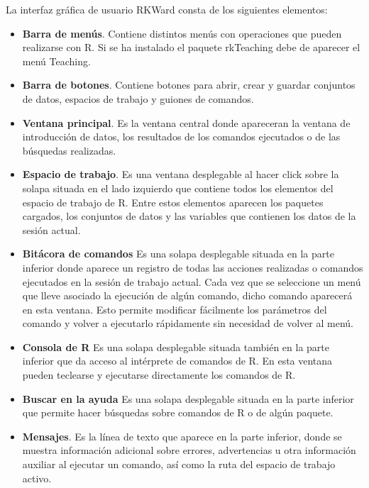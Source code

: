 La interfaz gráfica de usuario RKWard consta de los siguientes elementos:
\begin{itemize}
\item \textbf{Barra de menús}. Contiene distintos menús con operaciones que pueden realizarse con R. 
Si se ha instalado el paquete rkTeaching debe de aparecer el menú Teaching. 
\item \textbf{Barra de botones}. Contiene botones para abrir, crear y guardar conjuntos de datos, espacios de trabajo y guiones de comandos. 
\item \textbf{Ventana principal}. Es la ventana central donde apareceran la ventana de introducción de datos, los resultados de los comandos ejecutados o de las búsquedas realizadas. 
\item \textbf{Espacio de trabajo}. Es una ventana desplegable al hacer click sobre la solapa situada en el lado izquierdo que contiene todos los elementos del espacio de trabajo de R.
Entre estos elementos aparecen los paquetes cargados, los conjuntos de datos y las variables que contienen los datos de la sesión actual. 
\item \textbf{Bitácora de comandos} Es una solapa desplegable situada en la parte inferior donde aparece un registro de todas las acciones realizadas o comandos ejecutados en la sesión de trabajo actual.
Cada vez que se seleccione un menú que lleve asociado la ejecución de algún comando, dicho comando aparecerá en esta
ventana. Esto permite modificar fácilmente los parámetros del comando y volver a ejecutarlo rápidamente sin necesidad
de volver al menú. 
\item \textbf{Consola de R} Es una solapa desplegable situada también en la parte inferior que da acceso al intérprete de comandos de R.
En esta ventana pueden teclearse y ejecutarse directamente los comandos de R.
\item \textbf{Buscar en la ayuda} Es una solapa desplegable situada en la parte inferior que permite hacer búsquedas sobre comandos de R o de algún paquete.
\item \textbf{Mensajes}. Es la línea de texto que aparece en la parte inferior, donde se muestra información adicional sobre errores, advertencias u
otra información auxiliar al ejecutar un comando, así como la ruta del espacio de trabajo activo.  
\end{itemize}

